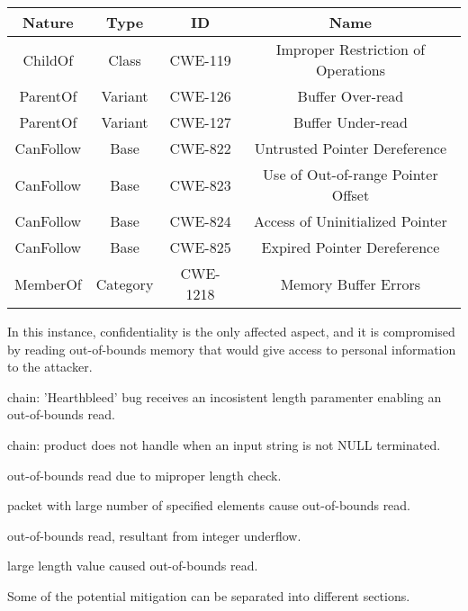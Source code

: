 \begin{table}[H]
  \begin{center}
    \label{tab:lab4-table4}
    \begin{tabular}{c c c c}
      \toprule
      \textbf{Nature} & \textbf{Type} & \textbf{ID} & \textbf{Name} \\
      \midrule
      ChildOf & Class & CWE-119 & Improper Restriction of Operations\\
      ParentOf & Variant & CWE-126 & Buffer Over-read\\
      ParentOf & Variant & CWE-127 & Buffer Under-read\\
      CanFollow & Base & CWE-822 & Untrusted Pointer Dereference\\
      CanFollow & Base & CWE-823 & Use of Out-of-range Pointer Offset\\
      CanFollow & Base & CWE-824 & Access of Uninitialized Pointer\\
      CanFollow & Base & CWE-825 & Expired Pointer Dereference\\
      MemberOf & Category & CWE-1218 & Memory Buffer Errors\\
      \bottomrule
    \end{tabular}
  \end{center}
\end{table}

In this instance, confidentiality is the only affected aspect, and it is
compromised by reading out-of-bounds memory that would give access to personal
information to the attacker.

\begin{description}[align=left]
  \item [CVE-2014-0160] chain: 'Hearthbleed' bug receives an incosistent
  length paramenter enabling an out-of-bounds read.
  \item [CVE-2009-2523] chain: product does not handle when an input string is
  not NULL terminated.
  \item [CVE-2004-0112] out-of-bounds read due to miproper length check.
  \item [CVE-2004-0183] packet with large number of specified elements cause
  out-of-bounds read.
  \item [CVE-2004-0184] out-of-bounds read, resultant from integer underflow.
  \item [CVE-2004-1940] large length value caused out-of-bounds read.
\end{description}

Some of the potential mitigation can be separated into different sections.

